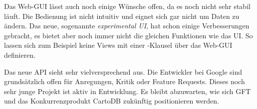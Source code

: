 Das Web-GUI lässt auch noch einige Wünsche offen, da es noch nicht sehr stabil läuft. Die Bedienung ist nicht intuitiv und eignet sich gar nicht um Daten zu ändern. Das neue, sogenannte \emph{experimental UI}, hat schon einige Verbesserungen gebracht, es bietet aber noch immer nicht die gleichen Funktionen wie das UI. So lassen sich zum Beispiel keine Views mit einer -Klausel über das Web-GUI definieren. 

Das neue API sieht sehr vielversprechend aus. Die Entwickler bei Google sind grundsätzlich offen für Anregungen, Kritik oder Feature Requests. Dieses noch sehr junge Projekt ist aktiv in Entwicklung. Es bleibt abzuwarten, wie sich GFT und das Konkurrenzprodukt CartoDB zukünftig positionieren werden.